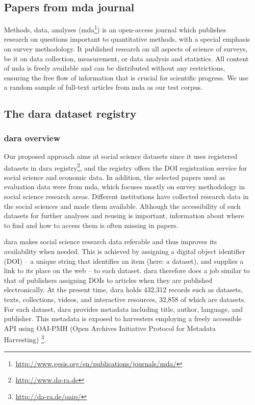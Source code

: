 \documentclass{IOS-Book-Article}
\newcommand{\dara}{\textsf{da\textbar ra}}
\begin{document}
 \subsection{Papers from mda journal}
 
 Methods, data, analyses (mda\footnote{\url{http://www.gesis.org/en/publications/journals/mda/}}) is an open-access journal which publishes research on questions important to quantitative methods, with a special emphasis on survey methodology. It published research on all aspects of science of surveys, be it on data collection, measurement, or data analysis and statistics. All content of mda is freely available and can be distributed without any restrictions, ensuring the free flow of information that is crucial for scientific progress. We use a random sample of full-text articles from mda as our test corpus.
  \subsection{The {\dara} dataset registry}
  
  \subsubsection{{\dara} overview}
Our proposed approach aims at social science datasets since it uses registered datasets in {\dara} registry\footnote{\url{http://www.da-ra.de}}, and the registry offers the DOI registration service for social science and economic data. In addition, the selected papers used as evaluation data were from mda, which focuses mostly on survey methodology in social science research areas. 
Different institutions have collected research data in the social sciences and made them available. Although the accessibility of such datasets for further analyses and reusing is important, information about where to find and how to access them is often missing in papers.

{\dara} makes social science research data referable and thus improves its availability when needed. This is achieved by assigning a digital object identifier (DOI) -- a unique string that identifies an item (here: a dataset), and supplies a link to its place on the web -- to each dataset. {\dara} therefore does a job similar to that of publishers assigning DOIs to articles when they are published electronically.
At the present time, {\dara} holds 432,312 records such as datasets, texts, collections, videos, and interactive resources, 32,858 of which are datasets. 
For each dataset, {\dara} provides metadata including title, author, language, and publisher. This metadata is exposed to harvesters employing a freely accessible API using OAI-PMH (Open Archives Initiative Protocol for Metadata Harvesting) \footnote{\url{http://da-ra.de/oaip/}}. 
  
\end{document}

